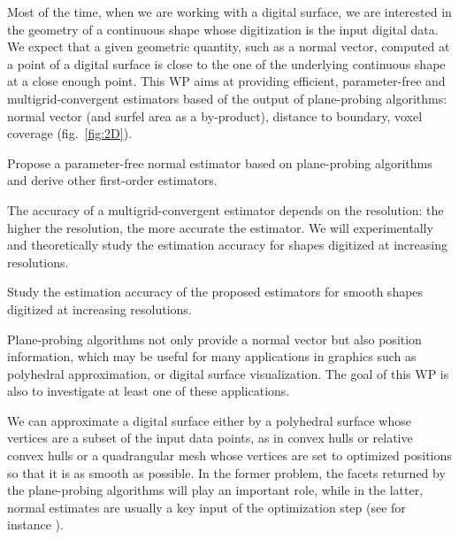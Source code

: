 
 Most of the time, when we are working with a digital surface, we are 
interested in the geometry of a continuous shape whose digitization is the input digital data.
We expect that a given geometric quantity, such as a normal vector, computed at a point of a digital surface
is close to the one of the underlying continuous shape at a close enough point. 
This WP aims at providing efficient, parameter-free and multigrid-convergent estimators based of
the output of plane-probing algorithms: normal vector (and surfel area as a by-product),
distance to boundary, voxel coverage (fig.~\ref{fig:2D}).

\begin{Task}
  \label{task:normal}
  Propose a parameter-free normal estimator based on plane-probing algorithms and
  derive other first-order estimators.  
\end{Task}

The accuracy of a multigrid-convergent estimator depends on the resolution: the higher the resolution,
the more accurate the estimator. We will experimentally and theoretically study the estimation accuracy
for shapes digitized at increasing resolutions. 

\begin{Task}
  \label{task:conv}
  Study the estimation accuracy of the proposed estimators for smooth shapes digitized at increasing resolutions. 
\end{Task}

Plane-probing algorithms not only provide a normal vector but also position information,
which may be useful for many applications in graphics such as polyhedral approximation,
 or digital surface visualization. The goal of this WP is also to investigate at least
one of these applications.   


We can approximate a digital surface either by a polyhedral surface whose vertices 
are a subset of the input data points, as in convex hulls or relative convex hulls
\cite{Klette2001,Schultz2009} 
or a quadrangular mesh whose vertices are set to optimized positions so that it is
as smooth as possible. In the former problem, the facets returned by the
plane-probing algorithms will play an important role, while in the latter,
normal estimates are usually a key input of the optimization step (see for instance
\cite{Coeurjolly2017}).  

